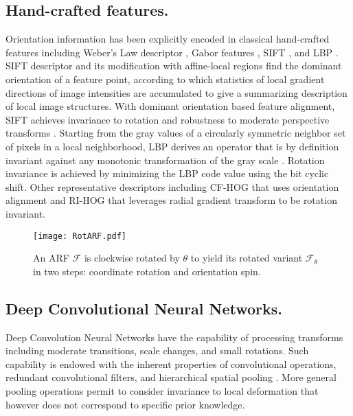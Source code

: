 \documentclass[10pt,twocolumn,letterpaper]{article}
\begin{document}
\subsection{Hand-crafted features.}
    Orientation information has been explicitly encoded in classical hand-crafted features including Weber's Law descriptor \cite{Chen2010}, Gabor features \cite{Haley1995,Han2007}, SIFT \cite{Lowe1999}, and LBP \cite{Ojala2002,Ahonen2006}. SIFT descriptor \cite{Lowe1999} and its modification with affine-local regions \cite{Lazebnik2004} find the dominant orientation of a feature point, according to which statistics of local gradient directions of image intensities are accumulated to give a summarizing description of local image structures. With dominant orientation based feature alignment, SIFT achieves invariance to rotation and robustness to moderate perspective transforms \cite{Bicego2006,Goesele2007}. Starting from the gray values of a circularly symmetric neighbor set of pixels in a local neighborhood, LBP derives an operator that is by definition invariant against any monotonic transformation of the gray scale \cite{Ojala2002,Ahonen2006}. Rotation invariance is achieved by minimizing the LBP code value using the bit cyclic shift. Other representative descriptors including CF-HOG \cite{Skibbe2012} that uses orientation alignment and RI-HOG \cite{Liu2014} that leverages radial gradient transform to be rotation invariant.

    \begin{figure*}
        \begin{center}
            \texttt{[image: RotARF.pdf]}
        \end{center}
        \caption{
            An ARF $\mathcal{F}$ is clockwise rotated by $\theta$ to yield its rotated variant $\mathcal{F}_{\theta}$ in two steps: coordinate rotation and orientation spin.
        }
    \label{fig:RotARF} 
    \vspace{-0.6em}
    \end{figure*}

\subsection{Deep Convolutional Neural Networks.}
    Deep Convolution Neural Networks have the capability of processing transforms including moderate transitions, scale changes, and small rotations. Such capability is endowed with the inherent properties of convolutional operations, redundant convolutional filters, and hierarchical spatial pooling \cite{Scherer2010,Jaderberg2015}. More general pooling operations \cite{Lee2016} permit to consider invariance to local deformation that however does not correspond to specific prior knowledge.
\end{document}
